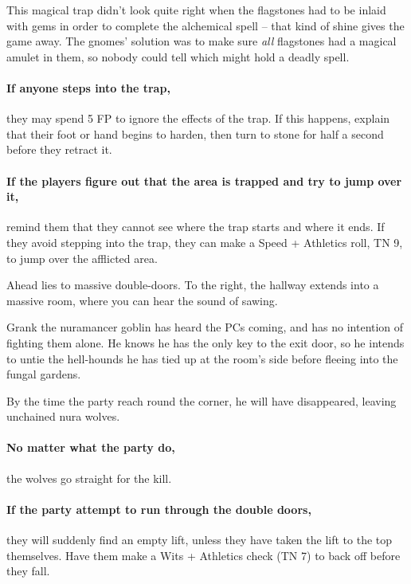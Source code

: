 \begin{multicols}{2}
This magical trap didn't look quite right when the flagstones had to be inlaid with gems in order to complete the alchemical spell -- that kind of shine gives the game away.
The gnomes' solution was to make sure \textit{all} flagstones had a magical amulet in them, so nobody could tell which might hold a deadly spell.

\paragraph{If anyone steps into the trap,}
they may spend 5 FP to ignore the effects of the trap.
If this happens, explain that their foot or hand begins to harden, then turn to stone for half a second before they retract it.

\paragraph{If the players figure out that the area is trapped and try to jump over it,}
remind them that they cannot see where the trap starts and where it ends.
If they avoid stepping into the trap, they can make a Speed + Athletics roll, TN 9, to jump over the afflicted area.


\begin{boxtext}

	Ahead lies to massive double-doors.
	To the right, the hallway extends into a massive room, where you can hear the sound of sawing.

\end{boxtext}

Grank the nuramancer goblin has heard the PCs coming, and has no intention of fighting them alone.
He knows he has the only key to the exit door, so he intends to untie the hell-hounds he has tied up at the room's side before fleeing into the fungal gardens.

By the time the party reach round the corner, he will have disappeared, leaving unchained nura wolves.


\paragraph{No matter what the party do,}
the wolves go straight for the kill.

\paragraph{If the party attempt to run through the double doors,}
they will suddenly find an empty lift, unless they have taken the lift to the top themselves.
Have them make a Wits + Athletics check (TN 7) to back off before they fall.


\end{multicols}
